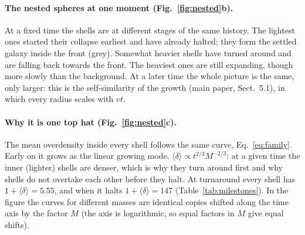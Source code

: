 \documentclass[11pt,a4paper]{article}
\newcommand{\md}{\langle\delta\rangle}
\begin{document}
\paragraph{The nested spheres at one moment (Fig.~\ref{fig:nested}b).} At a
fixed time the shells are at different stages of the same history. The
lightest ones started their collapse earliest and have already halted; they
form the settled galaxy inside the front (grey). Somewhat heavier shells
have turned around and are falling back towards the front. The heaviest ones
are still expanding, though more slowly than the background. At a later
time the whole picture is the same, only larger: this is the
self-similarity of the growth (main paper, Sect.~5.1), in which every radius
scales with $vt$.

\paragraph{Why it is one top hat (Fig.~\ref{fig:nested}c).} The mean
overdensity inside every shell follows the same curve,
Eq.~\eqref{eq:family}. Early on it grows as the linear growing mode,
$\md\propto t^{2/3}M^{-2/3}$: at a given time the inner (lighter) shells are
denser, which is why they turn around first and why shells do not overtake
each other before they halt. At turnaround every shell has $1+\md=5.55$, and
when it halts $1+\md=147$ (Table~\ref{tab:milestones}). In the figure the
curves for different masses are identical copies shifted along the time
axis by the factor $M$ (the axis is logarithmic, so equal factors in $M$
give equal shifts).
\end{document}
